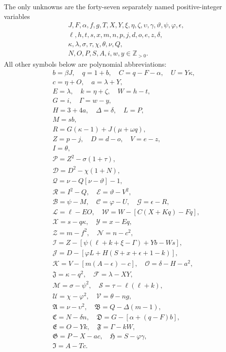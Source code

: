 The only unknowns are the forty-seven separately named positive-integer variables
\[
\begin{gathered}J,F,\alpha,f,g,T,X,Y,\xi,\eta,\zeta,\upsilon,\gamma,\vartheta,\psi,\varphi,\epsilon,\\
\ell,h,t,s,x,m,n,p,j,d,o,e,z,\delta,\\
\kappa,\lambda,\sigma,\tau,\chi,\theta,\nu,Q,\\
N,O,P,S,A,i,w,y\in\mathbb Z_{>0}.\end{gathered}
\]
All other symbols below are polynomial abbreviations:
\[
\begin{gathered}
b=\beta J,\quad q=1+b,\quad C=q-F-\alpha,\quad U=Y\kappa,\\
c=\eta+O,\quad a=\lambda+Y,\\
E=\lambda,\quad k=\eta+\zeta,\quad W=h-t,\\
G=i,\quad\Gamma=w-y,\\
H=3+4a,\quad\Delta=\delta,\quad L=P,\\
M=sb,\\
R=G(\kappa-1)+J(\mu+\omega q),\\
Z=p-j,\quad D=d-o,\quad V=e-z,\\
I=\theta,\\
\mathcal{P}=Z^2-\sigma(1+\tau),\\
\mathcal{D}=D^2-\chi(1+N),\\
\mathcal{Q}=\nu-Q[\nu-\vartheta]-1,\\
\mathcal{R}=I^2-Q,\quad \mathcal{E}=\vartheta-V^2,\\
\mathcal{B}=\psi-M,\quad \mathcal{C}=\varphi-U,\quad \mathcal{G}=\epsilon-R,\\
\mathcal{L}=\ell-EO,\quad \mathcal{W}=W-[C(X+Kq)-Fq],\\
\mathcal{X}=s-q\kappa,\quad \mathcal{Y}=x-Eq,\\
\mathcal{Z}=m-f^2,\quad \mathcal{N}=n-c^2,\\
\mathcal{I}=Z-[\psi(\ell+k+\xi-\Gamma)+Yb-Ws],\\
\mathcal{J}=D-[\varphi L+H(S+x+\epsilon+1-k)],\\
\mathcal{K}=V-[m(A-\epsilon)-c],\quad\mathcal{O}=\delta-H-a^2,\\
\mathfrak{J}=\kappa-q^2,\quad\mathcal{F}=\lambda-XY,\\
\mathcal{M}=\sigma-\psi^2,\quad\mathcal{S}=\tau-\ell(\ell+k),\\
\mathcal{U}=\chi-\varphi^2,\quad\mathcal{V}=\theta-ng,\\
\mathfrak{A}=\nu-\upsilon^2,\quad\mathfrak{B}=Q-\Delta(m-1),\\
\mathfrak{C}=N-\delta n,\quad\mathfrak{D}=G-[\alpha+(q-F)b],\\
\mathfrak{E}=O-Yk,\quad\mathfrak{F}=\Gamma-kW,\\
\mathfrak{G}=P-X-ac,\quad\mathfrak{H}=S-\varphi\gamma,\\
\mathfrak{I}=A-Tc.
\end{gathered}
\]
